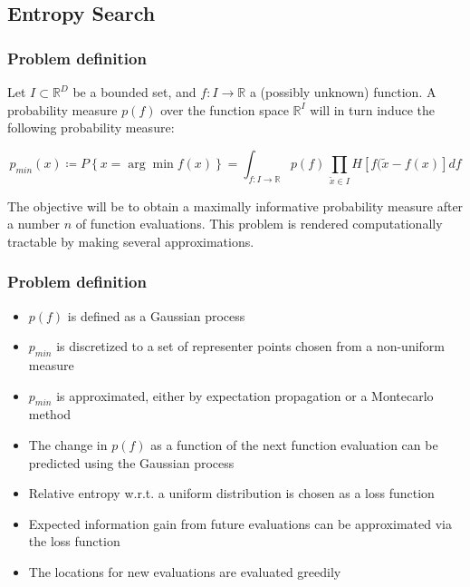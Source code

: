 \documentclass[10pt,handout]{beamer}
\begin{document}

\subsection{Entropy Search}

\begin{frame}
\frametitle{Problem definition}

Let $I \subset \mathbb R^D$ be a bounded set, and $f : I \rightarrow \mathbb{R}$
a (possibly unknown) function. A probability measure $p(f)$ over the function
space $\mathbb{R}^I$ will in turn induce the following probability measure:

\[
	p_{min}(x) \coloneqq P \left\{ x = \arg\!\min f(x) \right\} = 
	\int_{f: I \rightarrow \mathbb{R}} p(f) \, 
		\prod_{\widetilde x \in I} H[f(\widetilde{x} - f(x)] df
\]

The objective will be to obtain a maximally informative probability measure
after a number $n$ of function evaluations. This problem is rendered 
computationally tractable by making several approximations. 





\end{frame}

 
\begin{frame}
\frametitle{Problem definition}

\begin{itemize}
	\item $p(f)$ is defined as a Gaussian process
	\item $p_{min}$ is discretized to a set of representer points chosen from
	a non-uniform measure
	\item $p_{min}$ is approximated, either by expectation propagation
	or a Montecarlo method
	\item The change in $p(f)$ as a function of the next function evaluation
	can be predicted using the Gaussian process
	\item Relative entropy w.r.t. a uniform distribution is chosen as a loss
	function
	\item Expected information gain from future evaluations can be 
	approximated via the loss function
	\item The locations for new evaluations are evaluated greedily
\end{itemize}

\end{frame}
\end{document}
